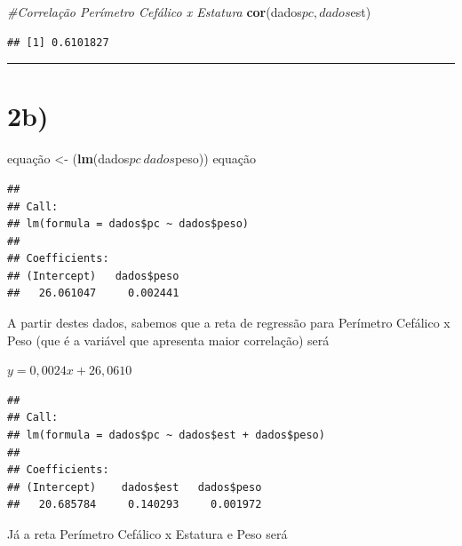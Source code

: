 \documentclass[11pt,]{article}
\newenvironment{Shaded}{\begin{snugshade}}{\end{snugshade}}
\newcommand{\KeywordTok}[1]{\textcolor[rgb]{0.13,0.29,0.53}{\textbf{{#1}}}}
\newcommand{\StringTok}[1]{\textcolor[rgb]{0.31,0.60,0.02}{{#1}}}
\newcommand{\CommentTok}[1]{\textcolor[rgb]{0.56,0.35,0.01}{\textit{{#1}}}}
\newcommand{\NormalTok}[1]{{#1}}
\begin{document}
\begin{Shaded}
\begin{Highlighting}[]
\CommentTok{#Correlação Perímetro Cefálico x Estatura}
\KeywordTok{cor}\NormalTok{(dados$pc,dados$est)}
\end{Highlighting}
\end{Shaded}

\begin{verbatim}
## [1] 0.6101827
\end{verbatim}

\begin{center}\rule{0.5\linewidth}{\linethickness}\end{center}

\section{2b)}\label{b-1}

\begin{Shaded}
\begin{Highlighting}[]
\NormalTok{equação <-}\StringTok{ }\NormalTok{(}\KeywordTok{lm}\NormalTok{(dados$pc~dados$peso))}
\NormalTok{equação}
\end{Highlighting}
\end{Shaded}

\begin{verbatim}
## 
## Call:
## lm(formula = dados$pc ~ dados$peso)
## 
## Coefficients:
## (Intercept)   dados$peso  
##   26.061047     0.002441
\end{verbatim}

A partir destes dados, sabemos que a reta de regressão para Perímetro
Cefálico x Peso (que é a variável que apresenta maior correlação) será

\(y = 0,0024x + 26,0610\)

\begin{Shaded}
\end{Shaded}

\begin{verbatim}
## 
## Call:
## lm(formula = dados$pc ~ dados$est + dados$peso)
## 
## Coefficients:
## (Intercept)    dados$est   dados$peso  
##   20.685784     0.140293     0.001972
\end{verbatim}

Já a reta Perímetro Cefálico x Estatura e Peso será
\end{document}
